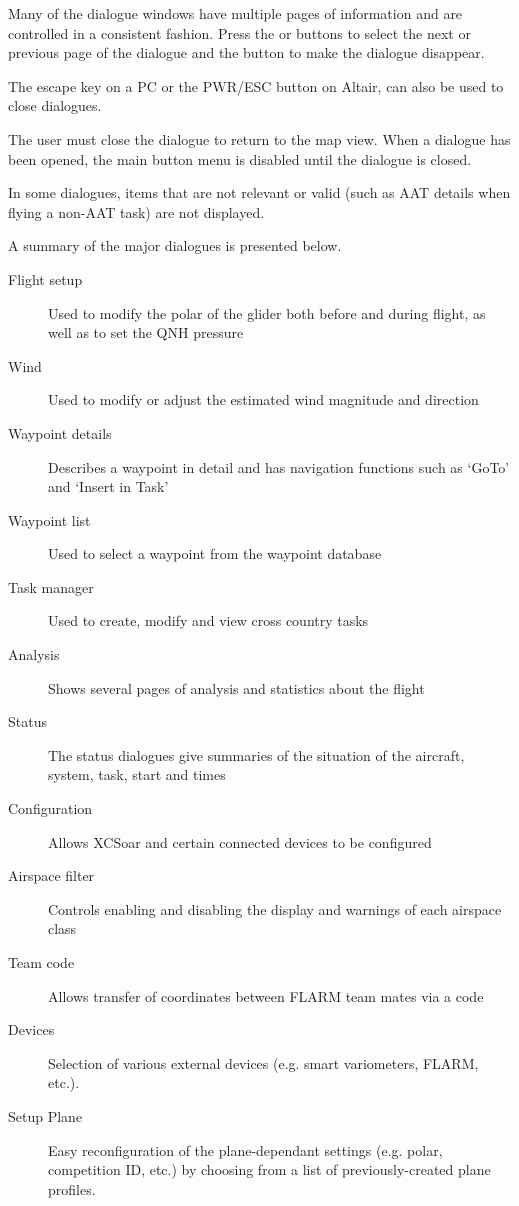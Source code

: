 Many of the dialogue windows have multiple pages of information and are controlled
in a consistent fashion. Press the \button{$<$} or \button{$>$} buttons to
select the next or previous page of the dialogue and the  button to
make the dialogue disappear.

The escape key on a PC or the PWR/ESC button on Altair, can also be used to
close dialogues.

The user must close the dialogue to return to the map view. When a dialogue
has been opened, the main button menu is disabled until the dialogue is closed.

In some dialogues, items that are not relevant or valid (such as AAT details when
flying a non-AAT task) are not displayed.

A summary of the major dialogues is presented below.
\begin{description}
\item[Flight setup] Used to modify the polar of the glider both before and
during flight, as well as to set the QNH pressure
\item[Wind] Used to modify or adjust the estimated wind magnitude and direction
\item[Waypoint details] Describes a waypoint in detail and has navigation
functions such as `GoTo' and `Insert in Task'
\item[Waypoint list] Used to select a waypoint from the waypoint database
\item[Task manager] Used to create, modify and view cross country tasks
\item[Analysis] Shows several pages of analysis and statistics about the flight
\item[Status] The status dialogues give summaries of the situation of the 
aircraft, system, task, start and times
\item[Configuration] Allows XCSoar and certain connected devices to be
configured
\item[Airspace filter] Controls enabling and disabling the display and warnings
of each airspace class
\item[Team code] Allows transfer of coordinates between FLARM team mates via a 
  code
\item[Devices]  Selection of various external devices (e.g. smart variometers, 
  FLARM, etc.).
\item[Setup Plane]  Easy reconfiguration of the plane-dependant settings (e.g. 
  polar, competition ID, etc.) by choosing from a list of previously-created 
  plane profiles.
\end{description}

